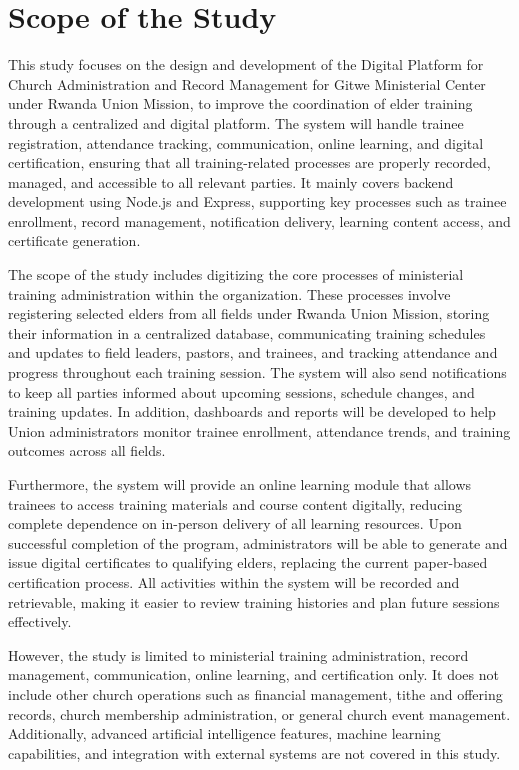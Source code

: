 \documentclass[12pt]{report}
\begin{document}
\section{Scope of the Study}
This study focuses on the design and development of the Digital Platform for Church Administration and Record Management for Gitwe Ministerial Center under Rwanda Union Mission, to improve the coordination of elder training through a centralized and digital platform. The system will handle trainee registration, attendance tracking, communication, online learning, and digital certification, ensuring that all training-related processes are properly recorded, managed, and accessible to all relevant parties. It mainly covers backend development using Node.js and Express, supporting key processes such as trainee enrollment, record management, notification delivery, learning content access, and certificate generation.

The scope of the study includes digitizing the core processes of ministerial training administration within the organization. These processes involve registering selected elders from all fields under Rwanda Union Mission, storing their information in a centralized database, communicating training schedules and updates to field leaders, pastors, and trainees, and tracking attendance and progress throughout each training session. The system will also send notifications to keep all parties informed about upcoming sessions, schedule changes, and training updates. In addition, dashboards and reports will be developed to help Union administrators monitor trainee enrollment, attendance trends, and training outcomes across all fields.

Furthermore, the system will provide an online learning module that allows trainees to access training materials and course content digitally, reducing complete dependence on in-person delivery of all learning resources. Upon successful completion of the program, administrators will be able to generate and issue digital certificates to qualifying elders, replacing the current paper-based certification process. All activities within the system will be recorded and retrievable, making it easier to review training histories and plan future sessions effectively.

However, the study is limited to ministerial training administration, record management, communication, online learning, and certification only. It does not include other church operations such as financial management, tithe and offering records, church membership administration, or general church event management. Additionally, advanced artificial intelligence features, machine learning capabilities, and integration with external systems are not covered in this study.
\end{document}
